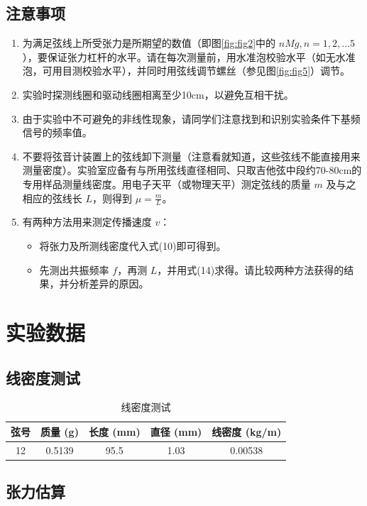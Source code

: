 \documentclass[11pt]{article}
\begin{document}
\subsection{注意事项}
\begin{enumerate}
    \item 为满足弦线上所受张力是所期望的数值（即图\ref{fig:fig2}中的 $nMg, n=1,2,\dots5$），要保证张力杠杆的水平。请在每次测量前，用水准泡校验水平（如无水准泡，可用目测校验水平），并同时用弦线调节螺丝（参见图\ref{fig:fig5}）调节。
    \item 实验时探测线圈和驱动线圈相离至少10cm，以避免互相干扰。
    \item 由于实验中不可避免的非线性现象，请同学们注意找到和识别实验条件下基频信号的频率值。
    \item 不要将弦音计装置上的弦线卸下测量（注意看就知道，这些弦线不能直接用来测量密度）。实验室应备有与所用弦线直径相同、只取吉他弦中段约70-80cm的专用样品测量线密度。用电子天平（或物理天平）测定弦线的质量 $m$ 及与之相应的弦线长 $L$，则得到 $\mu=\frac{m}{L}$。
    \item 有两种方法用来测定传播速度 $v$：
    \begin{itemize}
        \item 将张力及所测线密度代入式(10)即可得到。
        \item 先测出共振频率 $f$，再测 $L$，并用式(14)求得。请比较两种方法获得的结果，并分析差异的原因。
    \end{itemize}
\end{enumerate}

\section{实验数据}
\subsection{线密度测试}

\begin{table}[h]
    \centering
    \caption{线密度测试}
    \begin{tabular}{ccccc}
        \toprule
        弦号 & 质量 (g) & 长度 (mm) & 直径 (mm) & 线密度 (kg/m) \\
        \midrule
        12 & 0.5139 & 95.5 & 1.03 & 0.00538 \\
        \bottomrule
    \end{tabular}
\end{table}

\subsection{张力估算}
\end{document}
